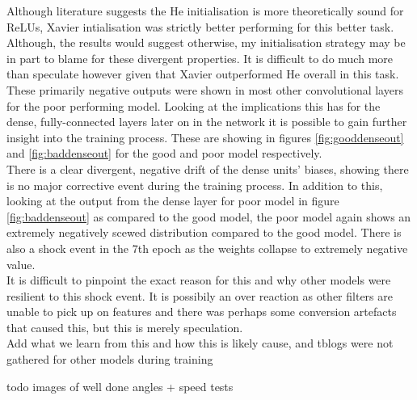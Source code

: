 \documentclass{article}
\begin{document}
Although literature suggests the He initialisation is more theoretically sound for ReLUs, Xavier intialisation was strictly better performing for this better task. Although, the results would suggest otherwise, my initialisation strategy may be in part to blame for these divergent properties. It is difficult to do much more than speculate however given that Xavier outperformed He overall in this task. \\

These primarily negative outputs were shown in most other convolutional layers for the poor performing model. Looking at the implications this has for the dense, fully-connected layers later on in the network it is possible to gain further insight into the training process. These are showing in figures \ref{fig:gooddenseout} and \ref{fig:baddenseout} for the good and poor model respectively. \\

There is a clear divergent, negative drift of the dense units' biases, showing there is no major corrective event during the training process. In addition to this, looking at the output from the dense layer for poor model in figure \ref{fig:baddenseout} as compared to the good model, the poor model again shows an extremely negatively scewed distribution compared to the good model. There is also a shock event in the 7th epoch as the weights collapse to extremely negative value.\\

It is difficult to pinpoint the exact reason for this and why other models were resilient to this shock event. It is possibily an over reaction as other filters are unable to pick up on features and there was perhaps some conversion artefacts that caused this, but this is merely speculation. \\

Add what we learn from this and how this is likely cause, and tblogs were not gathered for other models during training

todo images of well done angles + speed tests
\end{document}
